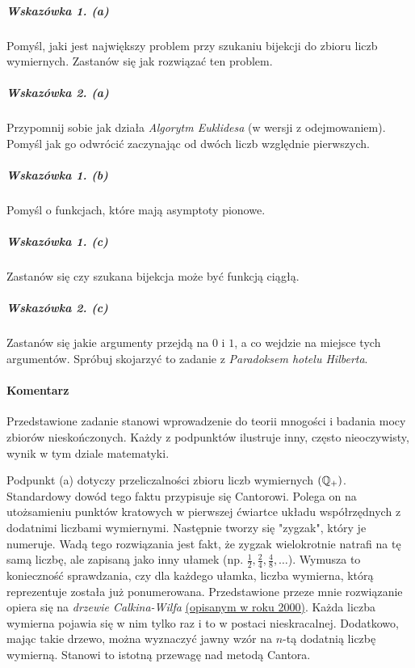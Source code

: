 
\subparagraph{Wskazówka 1. (a)}
Pomyśl, jaki jest największy problem przy szukaniu bijekcji do zbioru liczb wymiernych.
Zastanów się jak rozwiązać ten problem.

\subparagraph{Wskazówka 2. (a)}
Przypomnij sobie jak działa \textit{Algorytm Euklidesa} (w wersji z odejmowaniem).
Pomyśl jak go odwrócić zaczynając od dwóch liczb względnie pierwszych.

\subparagraph{Wskazówka 1. (b)}
Pomyśl o funkcjach, które mają asymptoty pionowe.

\subparagraph{Wskazówka 1. (c)}
Zastanów się czy szukana bijekcja może być funkcją ciągłą.

\subparagraph{Wskazówka 2. (c)}
Zastanów się jakie argumenty przejdą na $0$ i $1$, a co wejdzie na miejsce tych argumentów.
Spróbuj skojarzyć to zadanie z \textit{Paradoksem hotelu Hilberta}.

\paragraph{Komentarz} %

Przedstawione zadanie stanowi wprowadzenie do teorii mnogości i
badania mocy zbiorów nieskończonych. Każdy z podpunktów ilustruje
inny, często nieoczywisty, wynik w tym dziale matematyki.

Podpunkt (a) dotyczy przeliczalności zbioru liczb wymiernych $(\mathbb{Q}_+)$.
Standardowy dowód tego faktu przypisuje się Cantorowi. Polega on na
utożsamieniu punktów kratowych w pierwszej ćwiartce układu współrzędnych
z dodatnimi liczbami wymiernymi. Następnie tworzy się "zygzak", który je
numeruje. Wadą tego rozwiązania jest fakt, że zygzak wielokrotnie
natrafi na tę samą liczbę, ale zapisaną jako inny ułamek
(np. $\frac{1}{2}, \frac{2}{4}, \frac{4}{8}, \dots$). Wymusza to
konieczność sprawdzania, czy dla każdego ułamka, liczba wymierna, którą
reprezentuje została już ponumerowana.
Przedstawione przeze mnie rozwiązanie opiera się na
\textit{drzewie Calkina-Wilfa}
\href{https://www2.math.upenn.edu/~wilf/website/recounting.pdf}{(opisanym w roku 2000)}.
Każda liczba wymierna pojawia się w nim tylko raz i to w postaci
nieskracalnej. Dodatkowo, mając takie drzewo, można wyznaczyć
jawny wzór na $n$-tą dodatnią liczbę wymierną. Stanowi to istotną przewagę
nad metodą Cantora.


